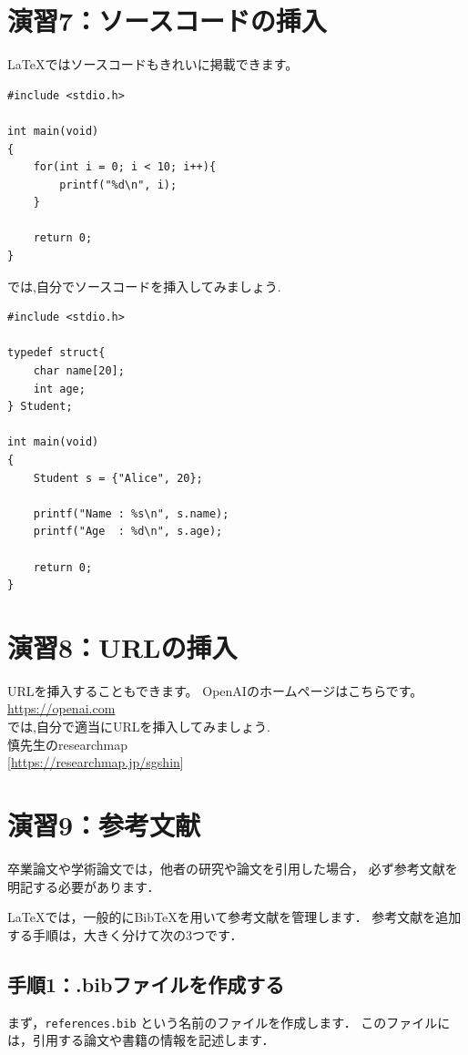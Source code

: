 \documentclass[a4paper,twocolumn]{jsarticle}
\begin{document}
\section*{演習7：ソースコードの挿入}

LaTeXではソースコードもきれいに掲載できます。

\begin{lstlisting}
#include <stdio.h>

int main(void)
{
    for(int i = 0; i < 10; i++){
        printf("%d\n", i);
    }

    return 0;
}
\end{lstlisting}
では,自分でソースコードを挿入してみましょう.\\
\begin{lstlisting}
#include <stdio.h>

typedef struct{
    char name[20];
    int age;
} Student;

int main(void)
{
    Student s = {"Alice", 20};

    printf("Name : %s\n", s.name);
    printf("Age  : %d\n", s.age);

    return 0;
}
\end{lstlisting}
\section*{演習8：URLの挿入}
URLを挿入することもできます。
OpenAIのホームページはこちらです。\\
\url{https://openai.com}\\
では,自分で適当にURLを挿入してみましょう.\\
慎先生のresearchmap\\
{[}\url{https://researchmap.jp/sgshin}{]}
\section*{演習9：参考文献}

卒業論文や学術論文では，他者の研究や論文を引用した場合，
必ず参考文献を明記する必要があります．

LaTeXでは，一般的にBibTeXを用いて参考文献を管理します．
参考文献を追加する手順は，大きく分けて次の3つです．

\subsection*{手順1：.bibファイルを作成する}

まず，\texttt{references.bib} という名前のファイルを作成します．
このファイルには，引用する論文や書籍の情報を記述します．
\end{document}

